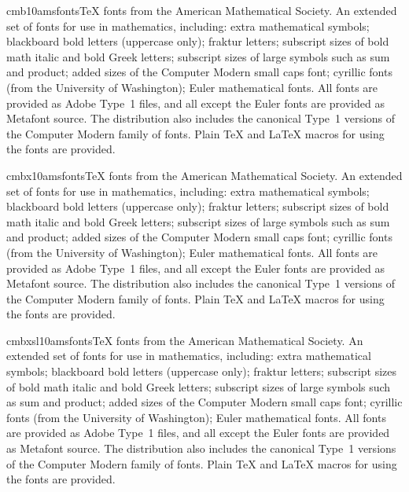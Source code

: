 \documentclass{ddltxtyp}
\begin{document}
\begin{package}{cmb10}{amsfonts}{{\TeX} fonts from the American Mathematical Society.}
An extended set of fonts for use in mathematics, including:
extra mathematical symbols; blackboard bold letters (uppercase
only); fraktur letters; subscript sizes of bold math italic and
bold Greek letters; subscript sizes of large symbols such as
sum and product; added sizes of the Computer Modern small caps
font; cyrillic fonts (from the University of Washington); Euler
mathematical fonts. All fonts are provided as Adobe Type~1
files, and all except the Euler fonts are provided as Metafont
source. The distribution also includes the canonical Type~1
versions of the Computer Modern family of fonts. Plain {\TeX} and
{\LaTeX} macros for using the fonts are provided.
\end{package}
\begin{package}{cmbx10}{amsfonts}{{\TeX} fonts from the American Mathematical Society.}
An extended set of fonts for use in mathematics, including:
extra mathematical symbols; blackboard bold letters (uppercase
only); fraktur letters; subscript sizes of bold math italic and
bold Greek letters; subscript sizes of large symbols such as
sum and product; added sizes of the Computer Modern small caps
font; cyrillic fonts (from the University of Washington); Euler
mathematical fonts. All fonts are provided as Adobe Type~1
files, and all except the Euler fonts are provided as Metafont
source. The distribution also includes the canonical Type~1
versions of the Computer Modern family of fonts. Plain {\TeX} and
{\LaTeX} macros for using the fonts are provided.
\end{package}
\begin{package}{cmbxsl10}{amsfonts}{{\TeX} fonts from the American Mathematical Society.}
An extended set of fonts for use in mathematics, including:
extra mathematical symbols; blackboard bold letters (uppercase
only); fraktur letters; subscript sizes of bold math italic and
bold Greek letters; subscript sizes of large symbols such as
sum and product; added sizes of the Computer Modern small caps
font; cyrillic fonts (from the University of Washington); Euler
mathematical fonts. All fonts are provided as Adobe Type~1
files, and all except the Euler fonts are provided as Metafont
source. The distribution also includes the canonical Type~1
versions of the Computer Modern family of fonts. Plain {\TeX} and
{\LaTeX} macros for using the fonts are provided.
\end{package}
\end{document}
